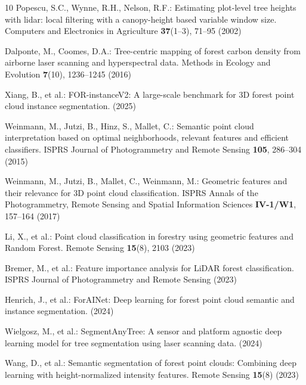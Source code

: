 \documentclass[runningheads]{llncs}
\begin{document}
\begin{thebibliography}{10}
Popescu, S.C., Wynne, R.H., Nelson, R.F.:
Estimating plot-level tree heights with lidar: local filtering with a canopy-height based variable window size.
Computers and Electronics in Agriculture \textbf{37}(1--3), 71--95 (2002)

Dalponte, M., Coomes, D.A.:
Tree-centric mapping of forest carbon density from airborne laser scanning and hyperspectral data.
Methods in Ecology and Evolution \textbf{7}(10), 1236--1245 (2016)

Xiang, B., et al.:
FOR-instanceV2: A large-scale benchmark for 3D forest point cloud instance segmentation.
(2025)

Weinmann, M., Jutzi, B., Hinz, S., Mallet, C.:
Semantic point cloud interpretation based on optimal neighborhoods, relevant features and efficient classifiers.
ISPRS Journal of Photogrammetry and Remote Sensing \textbf{105}, 286--304 (2015)

Weinmann, M., Jutzi, B., Mallet, C., Weinmann, M.:
Geometric features and their relevance for 3D point cloud classification.
ISPRS Annals of the Photogrammetry, Remote Sensing and Spatial Information Sciences \textbf{IV-1/W1}, 157--164 (2017)

Li, X., et al.:
Point cloud classification in forestry using geometric features and Random Forest.
Remote Sensing \textbf{15}(8), 2103 (2023)

Bremer, M., et al.:
Feature importance analysis for LiDAR forest classification.
ISPRS Journal of Photogrammetry and Remote Sensing (2023)

Henrich, J., et al.:
ForAINet: Deep learning for forest point cloud semantic and instance segmentation.
(2024)

Wielgosz, M., et al.:
SegmentAnyTree: A sensor and platform agnostic deep learning model for tree segmentation using laser scanning data.
(2024)

Wang, D., et al.:
Semantic segmentation of forest point clouds: Combining deep learning with height-normalized intensity features.
Remote Sensing \textbf{15}(8) (2023)


\end{thebibliography}
\end{document}
